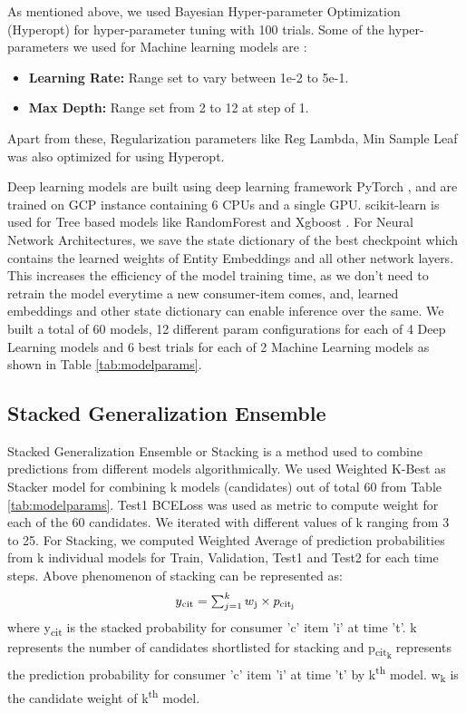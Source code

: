 As mentioned above, we used Bayesian Hyper-parameter Optimization (Hyperopt) \cite{bergstra2013hyperopt} for hyper-parameter 
tuning with 100 trials. Some of the hyper-parameters we used for Machine learning models are :
  \begin{itemize}
    \item {\bf Learning Rate:} Range set to vary between 1e-2 to 5e-1. 
    \item {\bf Max Depth:} Range set from 2 to 12 at step of 1.
  \end{itemize}
Apart from these, Regularization parameters like Reg Lambda, Min Sample Leaf was also optimized for using Hyperopt.

Deep learning models are built using deep learning framework
PyTorch \cite{paszke2017automatic}, and are trained on GCP instance containing 6 CPUs and a single GPU. 
scikit-learn \cite{pedregosa2011scikit} is used for Tree
based models like RandomForest and Xgboost \cite{chen2016xgboost}. For Neural Network Architectures, 
we save the state dictionary of the 
best checkpoint which contains the learned weights of Entity Embeddings and all other network layers.
This increases the efficiency of the model training time, as we don't need to retrain the model
everytime a new consumer-item comes, and, learned embeddings and other state dictionary can enable inference over the same.
We built a total of 60 models, 12 different param configurations for each of 4 
Deep Learning models and 6 best trials for each of 2 Machine Learning models as shown in Table \ref{tab:modelparams}.
\subsection{Stacked Generalization Ensemble}
Stacked Generalization Ensemble or Stacking \cite{wolpert1992stacked} is a method used to combine predictions from 
different models algorithmically.
We used Weighted K-Best as Stacker model for combining k models (candidates) out of total 60 from Table \ref{tab:modelparams}. 
Test1 BCELoss was used as metric to compute weight for each of the 60 candidates. We iterated with different 
values of k ranging from 3 to 25. For Stacking, we computed Weighted Average of prediction
probabilities from k individual models for Train, Validation, Test1 and Test2 for each time steps.
Above phenomenon of stacking can be represented as:
  \begin{equation}
    \begin{array}{l}
      y\textsubscript{cit} =\sum_{j=1}^{k}w\textsubscript{j} \times p\textsubscript{cit\textsubscript{j}}
    \end{array}
    \label{eqn:stack}
  \end{equation}
where y\textsubscript{cit} is the stacked probability for consumer 'c' item ’i’ at time ’t’.
k represents the number of candidates shortlisted for stacking and p\textsubscript{cit\textsubscript{k}}
represents the prediction probability for consumer 'c' item ’i’ at time ’t’ by k\textsuperscript{th} model.
w\textsubscript{k} is the candidate weight of k\textsuperscript{th} model.

